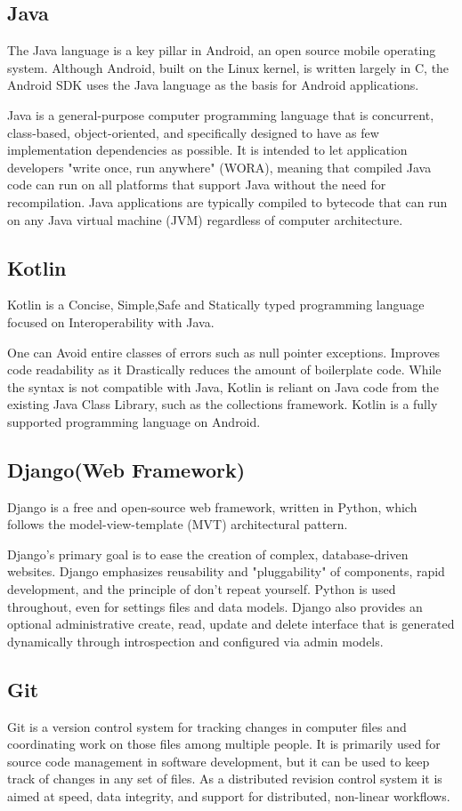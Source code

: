 \documentclass[BTech]{srmuthesis}
\begin{document}
\subsection{Java}
The Java language is a key pillar in Android, an open source mobile operating system. Although Android, built on the Linux kernel, is written largely in C, the Android SDK uses the Java language as the basis for Android applications.

Java is a general-purpose computer programming language that is concurrent, class-based, object-oriented, and specifically designed to have as few implementation dependencies as possible. It is intended to let application developers "write once, run anywhere" (WORA), meaning that compiled Java code can run on all platforms that support Java without the need for recompilation. Java applications are typically compiled to bytecode that can run on any Java virtual machine (JVM) regardless of computer architecture. 
\subsection{Kotlin}
Kotlin is a Concise, Simple,Safe and Statically typed programming language focused on Interoperability with Java. 

One can Avoid entire classes of errors such as null pointer exceptions. Improves code readability as it Drastically reduces the amount of boilerplate code. While the syntax is not compatible with Java, Kotlin is reliant on Java code from the existing Java Class Library, such as the collections framework. 
Kotlin is a fully supported programming language on Android.
\subsection{Django(Web Framework)}
Django is a free and open-source web framework, written in Python, which follows the model-view-template (MVT) architectural pattern.

Django's primary goal is to ease the creation of complex, database-driven websites. Django emphasizes reusability and "pluggability" of components, rapid development, and the principle of don't repeat yourself. Python is used throughout, even for settings files and data models. Django also provides an optional administrative create, read, update and delete interface that is generated dynamically through introspection and configured via admin models.
\subsection{Git}
Git is a version control system for tracking changes in computer files and coordinating work on those files among multiple people. It is primarily used for source code management in software development, but it can be used to keep track of changes in any set of files. As a distributed revision control system it is aimed at speed, data integrity, and support for distributed, non-linear workflows.
\end{document}
